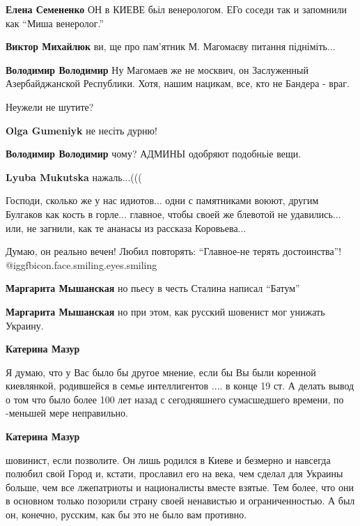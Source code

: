 \begin{itemize}
\begin{itemize}
\begin{itemize} %
\textbf{Елена Семененко} ОН в КИЕВЕ бьіл венерологом. ЕГо соседи так и запомнили как \enquote{Миша венеролог.}
\end{itemize} %

\textbf{Виктор Михайлюк} ви, ще про пам'ятник М. Магомаєву питання підніміть...

\textbf{Володимир Володимир}
Ну Магомаев же не москвич, он Заслуженный Азербайджанской Республики. Хотя, нашим нацикам, все, кто не Бандера - враг.

Неужели не шутите?

\textbf{Olga Gumeniyk} не несіть дурню!

\textbf{Володимир Володимир} чому? АДМИНЬІ одобряют подобньіе вещи.

\textbf{Lyuba Mukutska} нажаль...(((


Господи, сколько же у нас идиотов... одни с памятниками воюют, другим Булгаков
как кость в горле... главное, чтобы своей же блевотой не удавились... или, не
загнили, как те ананасы из рассказа Коровьева...

\end{itemize} %

Думаю, он реально вечен! Любил повторять: \enquote{Главное-не терять
достоинства}! @igg{fbicon.face.smiling.eyes.smiling} 

\begin{itemize} %
\textbf{Маргарита Мышанская} но пьесу в честь Сталина написал \enquote{Батум}

\textbf{Маргарита Мышанская} но при этом, как русский шовенист мог унижать Украину.

\begin{itemize} %
\textbf{Катерина Мазур} 

Я думаю, что у Вас было бы другое мнение, если бы Вы были коренной киевлянкой,
родившейся в семье интеллигентов .... в конце 19 ст. А делать вывод о том что
было более 100 лет назад с сегодняшнего сумасшедшего времени, по -меньшей мере
неправильно.

\textbf{Катерина Мазур} 

шовинист, если позволите. Он лишь родился в Киеве и безмерно и навсегда полюбил
свой Город и, кстати, прославил его на века, чем сделал для Украины больше, чем
все лжепатриоты и националисты вместе взятые. Тем более, что они в основном
только позорили страну своей ненавистью и ограниченностью. А был он, конечно,
русским, как бы это не было вам противно.


\end{itemize}
\end{itemize}
\end{itemize}
